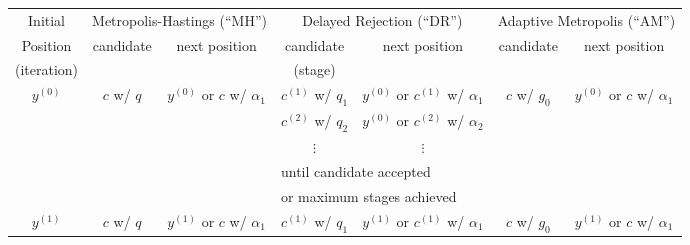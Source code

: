\begin{sidewaystable}[h]
\begin{tabular}{|c||c|c||c|c||c|c|}
\hline
 Initial             & \multicolumn{2}{c||}{Metropolis-Hastings (``MH'')}                & \multicolumn{2}{c||}{Delayed Rejection (``DR'')}                         & \multicolumn{2}{c|}{Adaptive Metropolis (``AM'')}          \\
\cline{2-7}
 Position            & candidate               & next position                           & candidate              & next position                                   & candidate        & next position                           \\
(iteration)          &                         &                                         & (stage)                &                                                 &                  &                                         \\
\hline
\hline
$y^{(0)}$       & $c$ w/ $q$              & $y^{(0)}$ or $c$ w/ $\alpha_1$       & $c^{(1)}$ w/ $q_1$     & $y^{(0)}$ or $c^{(1)}$ w/ $\alpha_1$       & $c$ w/ $g_0$     & $y^{(0)}$ or $c$ w/ $\alpha_1$       \\
\cline{4-5}
                     &                         &                                         & $c^{(2)}$ w/ $q_2$     & $y^{(0)}$ or $c^{(2)}$ w/ $\alpha_2$       &                  &                                         \\
\cline{4-5}
                     &                         &                                         & $\vdots$               & $\vdots$                                        &                  &                                         \\
\cline{4-5}
                     &                         &                                         & \multicolumn{2}{l||}{until candidate accepted}                           &                  &                                         \\
                     &                         &                                         & \multicolumn{2}{l||}{or maximum stages achieved}                         &                  &                                         \\
\hline 
\hline
$y^{(1)}$       & $c$ w/ $q$              & $y^{(1)}$ or $c$ w/ $\alpha_1$       & $c^{(1)}$ w/ $q_1$     & $y^{(1)}$ or $c^{(1)}$ w/ $\alpha_1$       & $c$ w/ $g_0$     & $y^{(1)}$ or $c$ w/ $\alpha_1$       \\

\end{tabular}
\end{sidewaystable}
